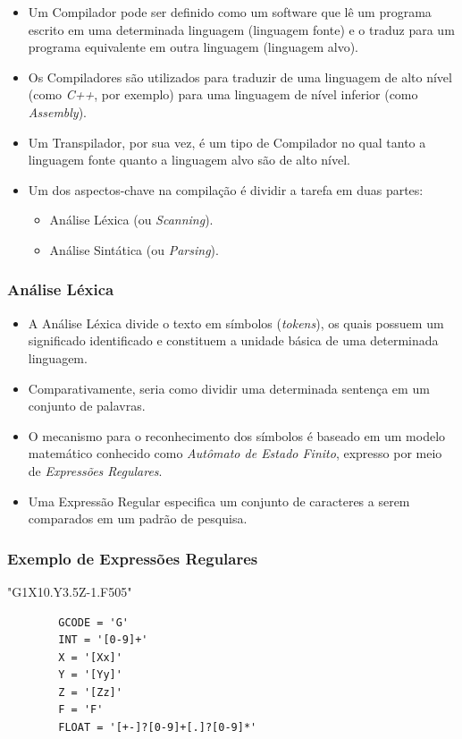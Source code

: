 \documentclass[aspectratio=169]{beamer}
\begin{document}
{\begin{frame}
  \begin{itemize}
    \item Um Compilador pode ser definido como um software que lê um 
          programa escrito em uma determinada linguagem (linguagem fonte) 
          e o traduz para um programa equivalente em outra linguagem 
          (linguagem alvo).
    \item Os Compiladores são utilizados para traduzir de uma linguagem 
          de alto nível (como \emph{C++}, por exemplo) para uma linguagem 
          de nível inferior (como \emph{Assembly}).
    \item Um Transpilador, por sua vez, é um tipo de Compilador no qual 
          tanto a linguagem fonte quanto a linguagem alvo são de alto 
          nível.
    \item Um dos aspectos-chave na compilação é dividir a tarefa em duas 
          partes:
          \begin{itemize}
            \item Análise Léxica (ou \emph{Scanning}).
            \item Análise Sintática (ou \emph{Parsing}).
          \end{itemize}
  \end{itemize} 

\end{frame}


\begin{frame}
  \frametitle{Análise Léxica}
  \begin{itemize}
    \item A Análise Léxica divide o texto em símbolos (\emph{tokens}),
          os quais possuem um significado identificado e constituem a 
          unidade básica de uma determinada linguagem.
    \item Comparativamente, seria como dividir uma determinada sentença 
          em um conjunto de palavras.
    \item O mecanismo para o reconhecimento dos símbolos é baseado em 
          um modelo matemático conhecido como \emph{Autômato de Estado 
          Finito}, expresso por meio de \emph{Expressões Regulares}.
    \item Uma Express\~ao Regular especifica um conjunto de caracteres 
          a serem comparados em um padr\~ao de pesquisa.
  \end{itemize}  

\end{frame}


\begin{frame}[fragile]
  \frametitle{Exemplo de Expressões Regulares}
  \begin{example}
      "G1X10.Y3.5Z-1.F505"
      \begin{lstlisting}
        GCODE = 'G'        
        INT = '[0-9]+'
        X = '[Xx]'
        Y = '[Yy]'
        Z = '[Zz]'
        F = 'F'
        FLOAT = '[+-]?[0-9]+[.]?[0-9]*'
      \end{lstlisting}
    \end{example}
  \end{frame}


}
\end{document}
